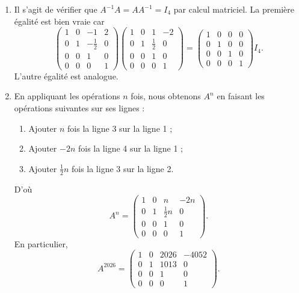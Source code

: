 {\begin{enumerate}
		En fait, nous avons que $(ABC)^{-1} = C^{-1} B^{-1} A^{-1}$.
			\[ A^{-1} = G_{31}(-1)G_{41}(2) G_{32}\left(-\frac12\right) = \begin{pmatrix}1&0&-1&2\\0&1&-\frac12&0\\0&0&1&0\\0&0&0&1\end{pmatrix} \]
		\item
		Il s'agit de vérifier que $A^{-1} A = AA^{-1} = I_4$ par calcul matriciel.
		La première égalité est bien vraie car
			\[ \begin{pmatrix}1&0&-1&2\\0&1&-\frac12&0\\0&0&1&0\\0&0&0&1\end{pmatrix}  \begin{pmatrix} 1 & 0& 1 & -2  \\ 0 & 1 & \frac12 & 0 \\ 0 & 0 & 1 & 0 \\ 0 & 0 & 0 & 1 \end{pmatrix} = \begin{pmatrix}1&0&0&0\\0&1&0&0\\0&0&1&0\\0&0&0&1\end{pmatrix} I_4. \]
		L'autre égalité est analogue.
		\item 
		En appliquant les opérations $n$ fois,
		nous obtenons $A^n$ en faisant les opérations suivantes sur ses lignes :
		\begin{enumerate}
			\item
			Ajouter $n$ fois la ligne 3 sur la ligne 1 ;
			\item
			Ajouter $-2n$ fois la ligne 4 sur la ligne 1 ;
			\item
			Ajouter $\frac12n$ fois la ligne 3 sur la ligne 2.
		\end{enumerate}
		D'où 
			\[ A^n = \begin{pmatrix} 1&0&n&-2n\\0&1&\frac12n&0\\0&0&1&0\\0&0&0&1\end{pmatrix}. \]
		En particulier, 
			\[ A^{2026} = \begin{pmatrix} 1&0&2026&-4052 \\0&1&1013&0\\0&0&1&0\\0&0&0&1\end{pmatrix}. \]
	\end{enumerate}
}


